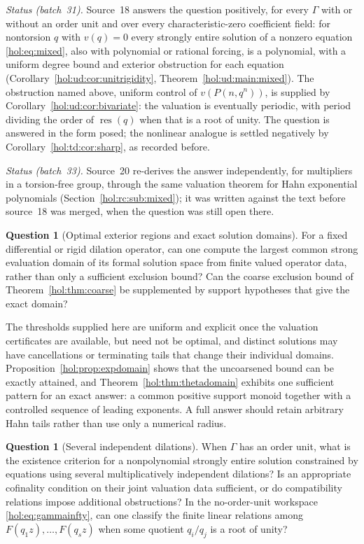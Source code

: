 \documentclass[11pt]{article}
\numberwithin{equation}{section}
\theoremstyle{definition}
\newtheorem{question}[theorem]{Question}
\theoremstyle{remark}
\newcommand{\res}{\operatorname{res}}
\begin{document}
\emph{Status (batch~31).} Source~18 answers the question positively, for every
$\Gamma$ with or without an order unit and over every characteristic-zero
coefficient field: for nontorsion $q$ with $v(q)=0$ every strongly entire
solution of a nonzero equation \eqref{hol:eq:mixed}, also with polynomial or
rational forcing, is a polynomial, with a uniform degree bound and exterior
obstruction for each equation (Corollary~\ref{hol:ud:cor:unitrigidity},
Theorem~\ref{hol:ud:main:mixed}). The obstruction named above, uniform control
of $v(P(n,q^n))$, is supplied by Corollary~\ref{hol:ud:cor:bivariate}: the
valuation is eventually periodic, with period dividing the order of
$\res(q)$ when that is a root of unity. The question is answered in the form
posed; the nonlinear analogue is settled negatively by
Corollary~\ref{hol:td:cor:sharp}, as recorded before.

\emph{Status (batch~33).} Source~20 re-derives the answer independently, for
multipliers in a torsion-free group, through the same valuation theorem for
Hahn exponential polynomials (Section~\ref{hol:rc:sub:mixed}); it was written
against the text before source~18 was merged, when the question was still
open there.

\begin{question}[Optimal exterior regions and exact solution domains]
\label{hol:q:optimal}
For a fixed differential or rigid dilation operator, can one compute the
largest common strong evaluation domain of its formal solution space from
finite valued operator data, rather than only a sufficient exclusion bound?
Can the coarse exclusion bound of Theorem~\ref{hol:thm:coarse} be supplemented
by support hypotheses that give the exact domain?
\end{question}

The thresholds supplied here are uniform and explicit once the valuation
certificates are available, but need not be optimal, and distinct solutions may
have cancellations or terminating tails that change their individual domains.
Proposition~\ref{hol:prop:expdomain} shows that the uncoarsened bound can be
exactly attained, and Theorem~\ref{hol:thm:thetadomain} exhibits one
sufficient pattern for an exact answer: a common positive support monoid
together with a controlled sequence of leading exponents. A full answer should
retain arbitrary Hahn tails rather than use only a numerical radius.

\begin{question}[Several independent dilations]\label{hol:q:severaldilations}
When $\Gamma$ has an order unit, what is the existence criterion for a
nonpolynomial strongly entire solution constrained by equations using several
multiplicatively independent dilations? Is an appropriate cofinality
condition on their joint valuation data sufficient, or do compatibility
relations impose additional obstructions? In the no-order-unit workspace
\eqref{hol:eq:gammainfty}, can one classify the finite linear relations among
$F(q_1z),\ldots,F(q_sz)$ when some quotient $q_i/q_j$ is a root of unity?
\end{question}
\end{document}
